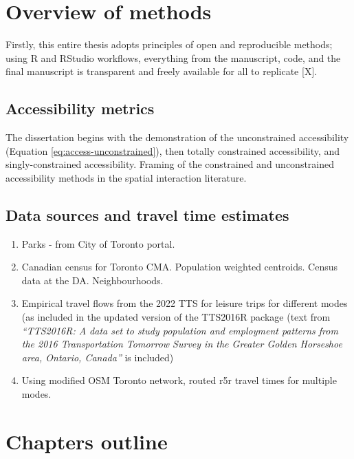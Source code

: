 \documentclass[
11pt, %
oneside, %
english, %
singlespacing, %
]{macthesis} %
\begin{document}
\section{Overview of methods}\label{overview-of-methods}

Firstly, this entire thesis adopts principles of open and reproducible methods; using R and RStudio workflows, everything from the manuscript, code, and the final manuscript is transparent and freely available for all to replicate {[}X{]}.

\subsection{Accessibility metrics}\label{accessibility-metrics}

The dissertation begins with the demonstration of the unconstrained accessibility (Equation \ref{eq:access-unconstrained}), then totally constrained accessibility, and singly-constrained accessibility. Framing of the constrained and unconstrained accessibility methods in the spatial interaction literature.

\subsection{Data sources and travel time estimates}\label{data-sources-and-travel-time-estimates}

\begin{enumerate}
\def\labelenumi{\arabic{enumi})}
\item
  Parks - from City of Toronto portal.
\item
  Canadian census for Toronto CMA. Population weighted centroids. Census data at the DA. Neighbourhoods.
\item
  Empirical travel flows from the 2022 TTS for leisure trips for different modes (as included in the updated version of the TTS2016R package (text from \emph{``TTS2016R: A data set to study population and employment patterns from the 2016 Transportation Tomorrow Survey in the Greater Golden Horseshoe area, Ontario, Canada''} is included)
\item
  Using modified OSM Toronto network, routed r5r travel times for multiple modes.
\end{enumerate}

\section{Chapters outline}\label{chapters-outline}
\end{document}
